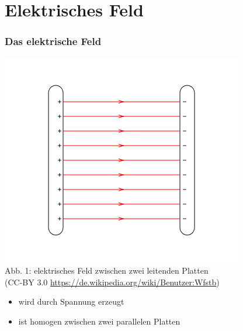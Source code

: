 

\subtitle{Technik Klasse E 08: \\
          Elektromagnetisches Feld \\[2em]}
\date{Stand 01.12.2016}



\section*{Elektrisches Feld}
\begin{frame}
\frametitle{Das elektrische Feld}
	\begin{center}
        \includegraphics[width=\textwidth,height=.6\textheight,keepaspectratio]{e08/PlattenkondensatorFeld.png}\\
        {\scriptsize Abb. 1: elektrisches Feld zwischen zwei leitenden Platten\\
         (CC-BY 3.0 \url{https://de.wikipedia.org/wiki/Benutzer:Wfstb})}
		\begin{itemize}
			\item wird durch Spannung erzeugt
			\item ist homogen zwischen zwei parallelen Platten
		\end{itemize}
	\end{center}
\end{frame}

